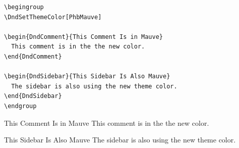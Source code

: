 \documentclass[letterpaper,twocolumn,openany,nodeprecatedcode]{dndbook}
\begin{document}
\begin{lstlisting}
\begingroup
\DndSetThemeColor[PhbMauve]

\begin{DndComment}{This Comment Is in Mauve}
  This comment is in the the new color.
\end{DndComment}

\begin{DndSidebar}{This Sidebar Is Also Mauve}
  The sidebar is also using the new theme color.
\end{DndSidebar}
\endgroup
\end{lstlisting}

\begingroup
\DndSetThemeColor[PhbMauve]

\begin{DndComment}{This Comment Is in Mauve}
  This comment is in the the new color.
\end{DndComment}

\begin{DndSidebar}{This Sidebar Is Also Mauve}
  The sidebar is also using the new theme color.
\end{DndSidebar}
\endgroup
\end{document}
